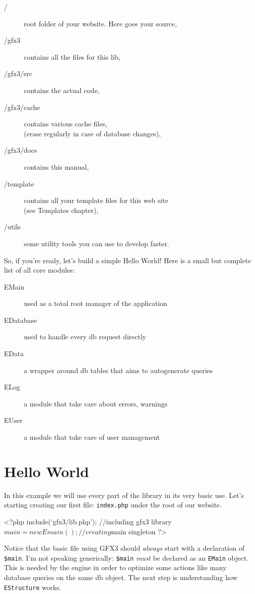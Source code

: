 \documentclass[a4paper,10pt]{article}
\newenvironment{file}[1]{
    \program
    \caption*{\textbf{File:} \texttt{#1}}
    \verbatim
}{
    \endverbatim
    \endprogram
}
\begin{document}
\begin{description}
 \item [/] root folder of your website. Here goes your source,
 \item[/gfx3]       contains all the files for this lib,
 \item[/gfx3/src]   contains the actual code,
 \item[/gfx3/cache] contains various cache files,\\(erase regularly in case of database changes),
 \item[/gfx3/docs]  contains this manual,
 \item[/template]   contains all your template files for this web site\\(see Templates chapter),
 \item[/utils]      some utility tools you can use to develop faster.
\end{description}
%
So, if you're ready, let's build a simple Hello World!
%
Here is a small but complete list of all core modules:
\begin{description}
 \item[EMain]     used as a total root manager of the application
 \item[EDatabase] used to handle every db request directly
 \item[EData]     a wrapper around db tables that aims to autogenerate queries
 \item[ELog]      a module that take care about errors, warnings 
 \item[EUser]     a module that take care of user management
\end{description}

\section{Hello World}
In this example we will use every part of the library in its very basic use.
Let's starting creating our first file: \texttt{index.php} under the root of our website.

\begin{file}{/index.php}
 <?php
 include(`gfx3/lib.php'); //including gfx3 library
 $main = new Emain(); //creating $main singleton
 ?>
\end{file}

Notice that the basic file using GFX3 should \emph{always} start with a declaration of \texttt{\$main}.
I'm not speaking generically: \texttt{\$main} \emph{must} be declared as an \texttt{EMain} object.
This is needed by the engine in order to optimize some actions
like many database queries on the same db object.
The next step is understanding how \texttt{EStructure} works.
\end{document}
